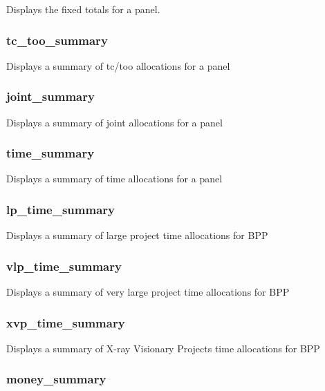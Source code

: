 \documentclass{article}
\begin{document}
Displays the fixed totals for a panel.

\subsubsection*{tc\_too\_summary\label{Monitor_tc_too_summary}}


Displays a summary of tc/too allocations for a panel

\subsubsection*{joint\_summary\label{Monitor_joint_summary}}


Displays a summary of joint allocations for a panel

\subsubsection*{time\_summary\label{Monitor_time_summary}}


Displays a summary of time allocations for a panel

\subsubsection*{lp\_time\_summary\label{Monitor_lp_time_summary}}


Displays a summary of large project time allocations for BPP

\subsubsection*{vlp\_time\_summary\label{Monitor_vlp_time_summary}}


Displays a summary of very large project time allocations for BPP

\subsubsection*{xvp\_time\_summary\label{Monitor_xvp_time_summary}}


Displays a summary of X-ray Visionary Projects time allocations for BPP

\subsubsection*{money\_summary\label{Monitor_money_summary}}
\end{document}
